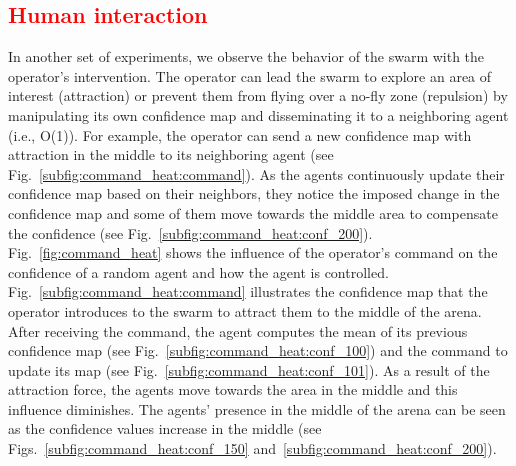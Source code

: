 \documentclass[runningheads]{llncs}%
\begin{document}
\subsection{\textcolor{red}{Human interaction}}
In another set of experiments, we observe the behavior of the swarm with the operator's intervention. %
The operator can lead the swarm to explore an area of interest (attraction) or prevent them from flying over a no-fly zone (repulsion) by manipulating its own confidence map and disseminating it to a neighboring agent (i.e., O(1)). For example, the operator can send a new confidence map with attraction in the middle to its neighboring agent (see Fig.~\ref{subfig:command_heat:command}). As the agents continuously update their confidence map based on their neighbors, they notice the imposed change in the confidence map and some of them move towards the middle area to compensate the confidence (see Fig.~\ref{subfig:command_heat:conf_200}). %
Fig.~\ref{fig:command_heat} shows the influence of the operator's command on the confidence of a random agent and how the agent is controlled. Fig.~\ref{subfig:command_heat:command} illustrates the confidence map that the operator introduces to the swarm to attract them to the middle of the arena. After receiving the command, the agent computes the mean of its previous confidence map (see Fig.~\ref{subfig:command_heat:conf_100}) and the command to update its map (see Fig.~\ref{subfig:command_heat:conf_101}). As a result of the attraction force, the agents move towards the area in the middle and this influence diminishes. The agents' presence in the middle of the arena can be seen as the confidence values increase in the middle (see Figs.~\ref{subfig:command_heat:conf_150} and~\ref{subfig:command_heat:conf_200}). 
\end{document}
